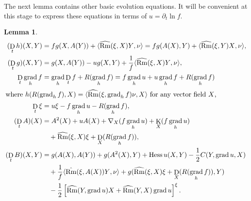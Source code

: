 \documentclass{amsart}
\newtheorem{lemma}[theorem]{Lemma}
\theoremstyle{definition}
\theoremstyle{remark}
\newcommand{\ip}[2]{\ensuremath{\langle{#1},{#2}\rangle}}
\DeclareMathOperator{\grad}{grad}
\DeclareMathOperator{\Rm}{Rm}
\DeclareMathOperator{\hess}{Hess}
\DeclareMathOperator{\diff}{K}
\DeclareMathOperator{\D}{D}
\numberwithin{equation}{section}
\begin{document}
The next lemma contains other basic evolution equations. It will be convenient at this stage to express these equations in terms of $u = \partial_t \ln f$.
\begin{lemma}
\begin{align*}
(\D_t h) (X, Y) &= f g(X, A(Y)) + \ip{\widehat{\Rm}(\xi, X) Y}{\nu} =  f g(A(X), Y) + \ip{\widehat{\Rm}(\xi, Y) X}{\nu}, \\
(\D_t g) (X, Y) &= g(X, A(Y)) - u g(X, Y) + \frac{1}{f} \ip{\widehat{\Rm}(\xi, X) Y}{\nu}, \\
\D_t \grad_h f &= \grad_h \D_t f + R(\grad_h f) = f \grad_h u + u \grad_h f + R(\grad_h f) \\
\intertext{where $h(R({\grad_h f}), X) = \ip{\widehat{\Rm}(\xi, \grad_h f) \nu}{X}$ for any vector field $X$,}
\D_t \xi &= u\xi - f\grad_h u - R(\grad_h f), \\
(\D_t A)(X) &= A^2(X) + u A(X) + \nabla_X (f\grad_h u) + \diff_X (f\grad_h u) \\
&\quad + \widehat{\Rm} (\xi, X) \xi + \D_X (R(\grad_h f)), \\
(\D_t B) (X, Y) &= g(A(X), A(Y)) + g(A^2(X), Y) + \hess u (X, Y) -\frac{1}{2} C(Y, \grad u, X) \\
&\quad +\frac{1}{f} \ip{\hat{\Rm} (\xi, A(X))Y}{\nu} + g(\widehat{\Rm}(\xi, X)\xi  + \D_X (R(\grad_h f)), Y) \\
&\quad -\frac{1}{2} \left[\widehat{\Rm} (Y, \grad u)X +  \widehat{\Rm} (Y, X) \grad u\right]^{\xi}.
\end{align*}
\end{lemma}
\end{document}
